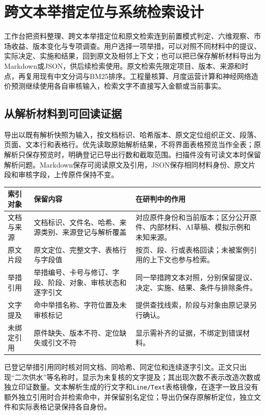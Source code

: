 \section{跨文本举措定位与系统检索设计}

工作台把资料整理、跨文本举措定位和原文检索连到前置模式判定、六维观察、市场收益、版本变化与专项调查。用户选择一项举措，可以对照不同材料中的提议、实际决定、实施和结果，回到原文及相邻上下文；也可以把已保存解析材料导出为Markdown或JSON，供后续检索使用。原文检索先限定项目、版本、来源和时点，再复用现有中文分词与BM25排序。工程量核算、月度运营计算和神经网络造价预测继续使用各自审核输入，检索文字不直接写入金额或当前事实。

\subsection{从解析材料到可回读证据}

导出以既有解析快照为输入，按文档标识、哈希版本、原文定位组织正文、段落、页面、文本行和表格行。优先读取原始解析结果，不将界面表格预览当作全表；原解析只保存预览时，明确登记已导出行数和截取范围。扫描件没有可读文本时保留解析问题。Markdown保存可阅读原文及引用，JSON保存相同材料身份、原文片段和审核字段，上传原件保持不变。

\begin{longtable}{L{25mm}L{50mm}L{80mm}}
\toprule
索引对象 & 保留内容 & 在研判中的作用\\
\midrule
\endhead
文档与来源 & 文档标识、文件名、哈希、来源类别、来源登记与解析覆盖 & 对应原件身份和当前版本；区分公开原件、内部材料、AI草稿、模拟示例和未知来源。\\
原文片段 & 原文定位、完整文字、表格行与字段值 & 按页、段、行或表格回读；未被案例引用的上下文也参与检索。\\
举措引用 & 举措编号、卡号与修订、字段、阶段、对象、审核状态和逐字引文 & 同一举措跨文本对照，分别保留提议、决定、实施、结果、条件与排除条件。\\
文字提及 & 命中举措名称、字符位置及未审核标记 & 提供查找线索，阶段与对象由原记录另行确认。\\
未绑定引用 & 原件缺失、版本不符、定位缺失或引文不符 & 显示需补齐的证据，不绑定到错误材料。\\
\bottomrule
\end{longtable}

已登记举措引用同时核对同文档、同哈希、同定位和连续逐字引文。正文只出现“二次供水”等名称时，显示为未复核的文字提及；其出现次数不表示改造次数或独立印证数量。文本解析生成的行文字和\texttt{Line/Text}表格镜像，在逐字一致且没有额外独立引用时合并检索命中，并保留别名定位；导出仍保存原解析定位，独立文件和实际表格记录保持各自身份。


